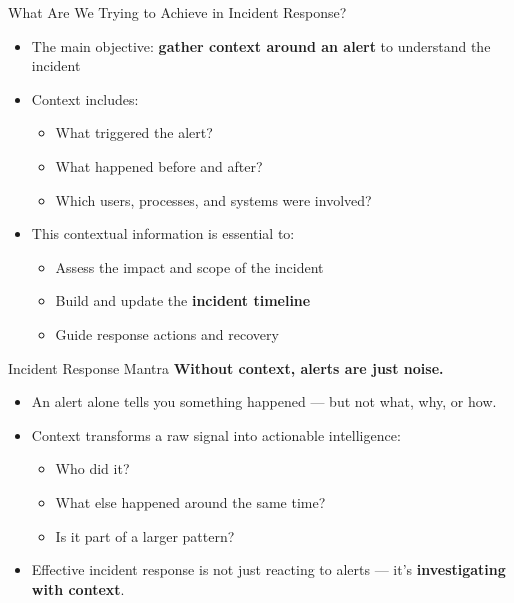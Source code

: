 \documentclass[12pt,aspectratio=169, colorlinks=true, linkcolor=circlBlue]{beamer}
\begin{document}
\begin{frame}{What Are We Trying to Achieve in Incident Response?}
	\begin{itemize}
		\item The main objective: \textbf{gather context around an alert} to understand the incident
		\item Context includes:
		      \begin{itemize}
			      \item What triggered the alert?
			      \item What happened before and after?
			      \item Which users, processes, and systems were involved?
		      \end{itemize}
		\item This contextual information is essential to:
		      \begin{itemize}
			      \item Assess the impact and scope of the incident
			      \item Build and update the \textbf{incident timeline}
			      \item Guide response actions and recovery
		      \end{itemize}
	\end{itemize}

\end{frame}



\begin{frame}{Incident Response Mantra}
	\faLightbulb \centering\large\textbf{ Without context, alerts are just noise.}
	\begin{itemize}
		\item An alert alone tells you something happened — but not what, why, or how.
		\item Context transforms a raw signal into actionable intelligence:
		      \begin{itemize}
			      \item Who did it?
			      \item What else happened around the same time?
			      \item Is it part of a larger pattern?
		      \end{itemize}
		\item Effective incident response is not just reacting to alerts — it's \textbf{investigating with context}.
	\end{itemize}
\end{frame}
\end{document}
